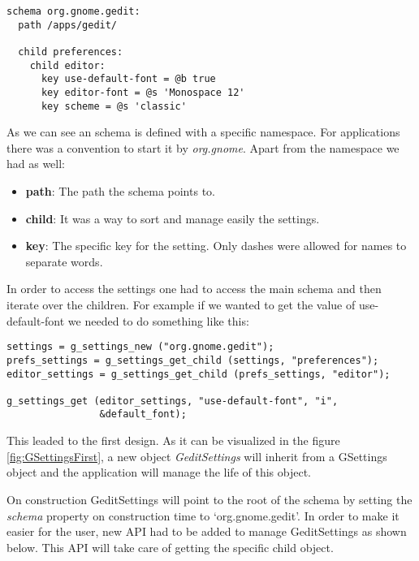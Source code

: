 \begin{lstlisting}[style=GObject]
schema org.gnome.gedit:
  path /apps/gedit/

  child preferences:
    child editor:
      key use-default-font = @b true
      key editor-font = @s 'Monospace 12'
      key scheme = @s 'classic'

\end{lstlisting}

As we can see an schema is defined with a specific namespace. For \GNOME applications there was a convention to start it by \emph{org.gnome}. Apart from the namespace we had as well:
\begin{itemize}
  \item \textbf{path}: The path the schema points to.
  \item \textbf{child}: It was a way to sort and manage easily the settings.
  \item \textbf{key}: The specific key for the setting. Only dashes were allowed for names to separate words.
\end{itemize}

In order to access the settings one had to access the main schema and then iterate over the children. For example if we wanted to get the value of use-default-font we needed to do something like this:

\begin{lstlisting}[style=GObject]
settings = g_settings_new ("org.gnome.gedit");
prefs_settings = g_settings_get_child (settings, "preferences");
editor_settings = g_settings_get_child (prefs_settings, "editor");

g_settings_get (editor_settings, "use-default-font", "i",
                &default_font);
\end{lstlisting}

This leaded to the first design. As it can be visualized in the figure \ref{fig:GSettingsFirst}, a new object \emph{GeditSettings} will inherit from a GSettings object and the application will manage the life of this object.


On construction GeditSettings will point to the root of the schema by setting the \emph{schema} property on construction time to `org.gnome.gedit'.
In order to make it easier for the user, new API had to be added to manage GeditSettings as shown below. This API will take care of getting the specific child object.

